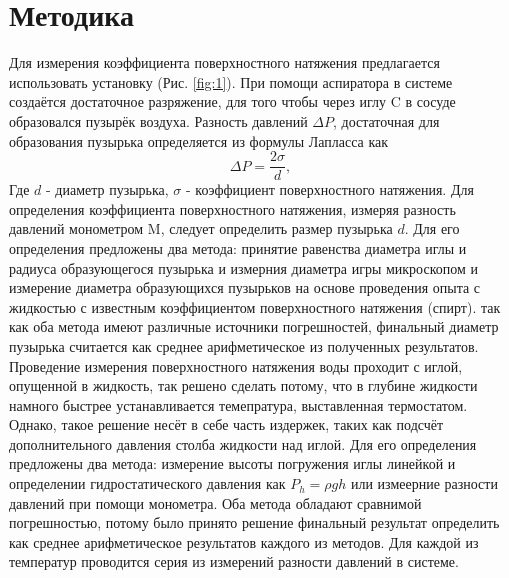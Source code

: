\documentclass[12pt]{article}
\begin{document}
\section{Методика}
Для измерения коэффициента поверхностного натяжения предлагается использовать установку (Рис. \ref{fig:1}). 
При помощи аспиратора в системе создаётся достаточное разряжение, для того чтобы через иглу C в сосуде 
образовался пузырёк воздуха. Разность давлений $\Delta P$, достаточная для образования пузырька определяется из формулы Лапласса как 
\begin{equation}
    \Delta P = \frac{2\sigma}{d},
    \label{eq:1}
\end{equation}
Где $d$ - диаметр пузырька, $\sigma$ - коэффициент поверхностного натяжения. Для определения коэффициента 
поверхностного натяжения, измеряя разность давлений монометром M, следует определить размер пузырька $d$. 
Для его определения предложены два метода: принятие равенства диаметра иглы и радиуса образующегося пузырька и измерния диаметра игры микроскопом и 
измерение диаметра образующихся пузырьков на основе проведения опыта с жидкостью с известным коэффициентом поверхностного натяжения (спирт). так как оба метода 
имеют различные источники погрешностей, финальный диаметр пузырька считается как среднее арифметическое из полученных результатов. 
Проведение измерения поверхностного натяжения воды проходит с иглой, опущенной в жидкость, так решено сделать потому, что 
в глубине жидкости намного быстрее устанавливается темепратура, выставленная термостатом. Однако, такое решение несёт в себе часть издержек, 
таких как подсчёт дополнительного давления столба жидкости над иглой. Для его определения предложены два метода: 
измерение высоты погружения иглы линейкой и определении гидростатического давления как $P_h = \rho g h$ или 
измеерние разности давлений при помощи монометра. Оба метода обладают сравнимой погрешностью, потому было принято решение 
финальный результат определить как среднее арифметическое результатов каждого из методов. 
Для каждой из температур проводится серия из измерений разности давлений в системе.
\end{document}
